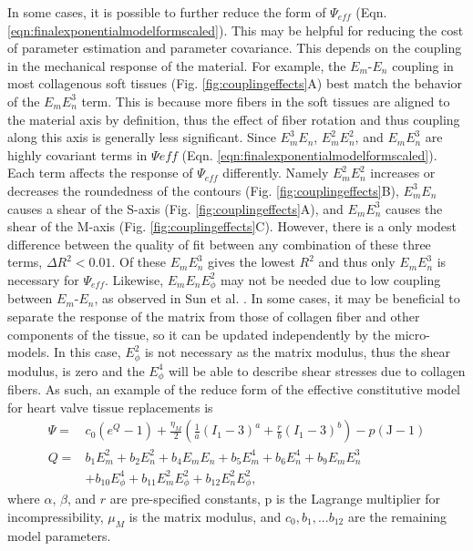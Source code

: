     
	In some cases, it is possible to further reduce the form of $\Psi_{eff}$ (Eqn. \ref{eqn:finalexponentialmodelformscaled}). This may be helpful for reducing the cost of parameter estimation and parameter covariance. This depends on the coupling in the mechanical response of the material. For example, the $E_m$-$E_n$ coupling in most collagenous soft tissues (Fig. \ref{fig:couplingeffects}A) best match the behavior of the $E_m E_n^3$ term. This is because more fibers in the soft tissues are aligned to the material axis by definition, thus the effect of fiber rotation and thus coupling along this axis is generally less significant. Since $E_m^3 E_n$, $E_m^2 E_n^2$, and $E_m E_n^3$ are highly covariant terms in $\Psi{eff}$ (Eqn. \ref{eqn:finalexponentialmodelformscaled}). Each term affects the response of $\Psi_{eff}$ differently. Namely $E_m^2 E_n^2$ increases or decreases the roundedness of the contours (Fig. \ref{fig:couplingeffects}B), $E_m^3 E_n$ causes a shear of the S-axis (Fig. \ref{fig:couplingeffects}A), and $E_m E_n^3$ causes the shear of the M-axis (Fig. \ref{fig:couplingeffects}C). However, there is a only modest difference between the quality of fit between any combination of these three terms, $\Delta R^2<0.01$. Of these $E_m E_n^3$ gives the lowest $R^2$ and thus only $E_m E_n^3$ is necessary for $\Psi_{eff}$. Likewise, $E_m E_n E_\phi^2$ may not be needed due to low coupling between $E_m$-$E_n$, as observed in Sun et al. \cite{sun_biaxial_2003}. In some cases, it may be beneficial to separate the response of the matrix from those of collagen fiber and other components of the tissue, so it can be updated independently by the micro-models. In this case, $E_\phi^2$ is not necessary as the matrix modulus, thus the shear modulus, is zero and the $E_\phi^4$ will be able to describe shear stresses due to collagen fibers. As such, an example of the reduce form of the effective constitutive model for heart valve tissue replacements is
\begin{equation}
\begin{aligned}\label{eqn:finalmodelform}
\Psi	=& c_0 \left(e^{Q} - 1\right) + \frac{\eta_M}{2} \left( \frac{1}{a}\left( I_1 -3\right)^{a} + \frac{r}{b} \left( I_1 -3\right)^{b} \right) - p\left(\mathrm{J}-1\right)\\
Q		=& b_1 E_m^2 + b_2 E_n^2 + b_4 E_m E_n + b_5 E_m^4 + b_6 E_n^4 + b_9 E_m E_n^3	\\
	&+ b_{10} E_\phi^4 + b_{11} E_m^2E_\phi^2 + b_{12} E_n^2 E_\phi^2,
\end{aligned}
\end{equation}
where $\alpha$, $\beta$, and $r$ are pre-specified constants, p is the Lagrange multiplier for incompressibility, $\mu_M$ is the matrix modulus, and $c_0, b_1,...b_{12}$ are the remaining model parameters.



